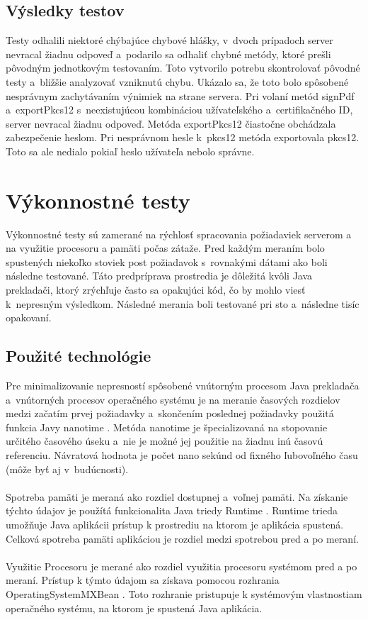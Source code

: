 \documentclass[
  digital, %
  table,   %
oneside,
  nolof,     %
  nolot,     %
]{fithesis3}
\begin{document}
\subsection{Výsledky testov}
Testy odhalili niektoré chýbajúce chybové hlášky, v~dvoch prípadoch server nevracal žiadnu odpoveď a~podarilo sa odhaliť chybné metódy, ktoré prešli pôvodným jednotkovým testovaním.
Toto vytvorilo potrebu skontrolovať pôvodné testy a~bližšie analyzovať vzniknutú chybu. Ukázalo sa, že toto bolo spôsobené nesprávnym zachytávaním výnimiek na strane servera.
Pri volaní metód signPdf a~exportPkcs12 s~neexistujúcou kombináciou užívateľského a~certifikačného ID, server nevracal žiadnu odpoveď. Metóda exportPkcs12 čiastočne obchádzala zabezpečenie heslom. Pri nesprávnom hesle k~pkcs12 metóda exportovala pkcs12. Toto sa ale nedialo pokiaľ heslo užívateľa nebolo správne.
\section{Výkonnostné testy}
Výkonnostné testy sú zamerané na rýchlosť spracovania požiadaviek serverom a na využitie procesoru a pamäti počas zátaže.
Pred každým meraním bolo spustených niekoľko stoviek post požiadavok s~rovnakými dátami ako boli následne testované. Táto predpríprava prostredia je dôležitá kvôli Java prekladači, ktorý zrýchľuje často sa opakujúci kód, čo by mohlo viesť k~nepresným výsledkom. Následné merania boli  testované pri sto a~následne tisíc opakovaní.
\subsection{Použité technológie}
Pre minimalizovanie nepresností spôsobené vnútorným procesom Java prekladača a~vnútorných procesov operačného systému je na meranie časových rozdielov medzi začatím prvej požiadavky a~skončením poslednej požiadavky použitá funkcia Javy nanotime \cite{systemNanotime}. Metóda nanotime je špecializovaná na stopovanie určitého časového úseku a~nie je možné jej použitie na žiadnu inú časovú referenciu. Návratová hodnota je počet nano sekúnd od fixného ľubovoľného času (môže byť aj v~budúcnosti).
\paragraph{}
Spotreba pamäti je meraná ako rozdiel dostupnej a~voľnej pamäti. Na získanie týchto údajov je použítá funkcionalita Java triedy Runtime \cite{runtime}. Runtime trieda umožňuje Java aplikácii prístup k prostrediu na ktorom je aplikácia spustená. Celková spotreba pamäti aplikáciou je rozdiel medzi spotrebou pred a po meraní. \paragraph{}
Využitie Procesoru je merané ako rozdiel využitia procesoru systémom pred a po meraní. Prístup k týmto údajom sa získava pomocou rozhrania OperatingSystemMXBean \cite{mxBean}. Toto rozhranie pristupuje k systémovým vlastnostiam operačného systému, na ktorom je spustená Java aplikácia.  
\end{document}
